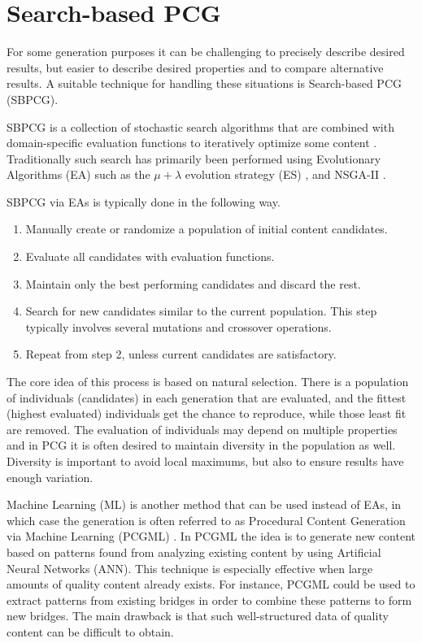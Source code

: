 \section{Search-based PCG}

For some generation purposes it can be challenging to precisely describe desired results, but easier to describe desired properties and to compare alternative results.
A suitable technique for handling these situations is Search-based PCG (SBPCG).

SBPCG is a collection of stochastic search algorithms that are combined with domain-specific evaluation functions to iteratively optimize some content \cite{search_based_pcg} \cite{search_based_pcg2}.
Traditionally such search has primarily been performed using Evolutionary Algorithms (EA) such as the $\mu + \lambda$ evolution strategy (ES) \cite[p.18-20]{pcg_in_games}, and NSGA-II \cite{nsgaii}.

SBPCG via EAs is typically done in the following way.
\vspace{-0.5cm} %
\begin{enumerate}
  \item Manually create or randomize a population of initial content candidates.
  \item Evaluate all candidates with evaluation functions.
  \item Maintain only the best performing candidates and discard the rest.
  \item Search for new candidates similar to the current population. This step typically involves several mutations and crossover operations.
  \item Repeat from step 2, unless current candidates are satisfactory.
\end{enumerate}

The core idea of this process is based on natural selection.
There is a population of individuals (candidates) in each generation that are evaluated, and the fittest (highest evaluated) individuals get the chance to reproduce, while those least fit are removed.
The evaluation of individuals may depend on multiple properties and in PCG it is often desired to maintain diversity in the population as well.
Diversity is important to avoid local maximums, but also to ensure results have enough variation.

Machine Learning (ML) is another method that can be used instead of EAs, in which case the generation is often referred to as Procedural Content Generation via Machine Learning (PCGML) \cite{pcgml} \cite{pcgml2} \cite{pcgml3}.
In PCGML the idea is to generate new content based on patterns found from analyzing existing content by using Artificial Neural Networks (ANN).
This technique is especially effective when large amounts of quality content already exists.
For instance, PCGML could be used to extract patterns from existing bridges in order to combine these patterns to form new bridges.
The main drawback is that such well-structured data of quality content can be difficult to obtain.


